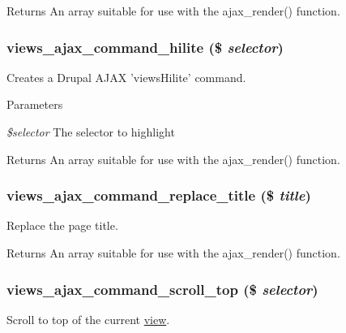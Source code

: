 \begin{DoxyReturn}{Returns}
An array suitable for use with the ajax\_\-render() function. 
\end{DoxyReturn}
\hypertarget{group__ajax_ga22d27c9ab6b8a95f4903463eb6aabf8d}{
\subsubsection[{views\_\-ajax\_\-command\_\-hilite}]{\setlength{\rightskip}{0pt plus 5cm}views\_\-ajax\_\-command\_\-hilite (\$ {\em selector})}}
\label{group__ajax_ga22d27c9ab6b8a95f4903463eb6aabf8d}
Creates a Drupal AJAX 'viewsHilite' command.


\begin{DoxyParams}{Parameters}
\item[{\em \$selector}]The selector to highlight\end{DoxyParams}
\begin{DoxyReturn}{Returns}
An array suitable for use with the ajax\_\-render() function. 
\end{DoxyReturn}
\hypertarget{group__ajax_ga42db219284fd40096900731ee6d13600}{
\subsubsection[{views\_\-ajax\_\-command\_\-replace\_\-title}]{\setlength{\rightskip}{0pt plus 5cm}views\_\-ajax\_\-command\_\-replace\_\-title (\$ {\em title})}}
\label{group__ajax_ga42db219284fd40096900731ee6d13600}
Replace the page title.

\begin{DoxyReturn}{Returns}
An array suitable for use with the ajax\_\-render() function. 
\end{DoxyReturn}
\hypertarget{group__ajax_gac7d8055fd4e9c91501496391dbe94b5a}{
\subsubsection[{views\_\-ajax\_\-command\_\-scroll\_\-top}]{\setlength{\rightskip}{0pt plus 5cm}views\_\-ajax\_\-command\_\-scroll\_\-top (\$ {\em selector})}}
\label{group__ajax_gac7d8055fd4e9c91501496391dbe94b5a}
Scroll to top of the current \hyperlink{classview}{view}.

